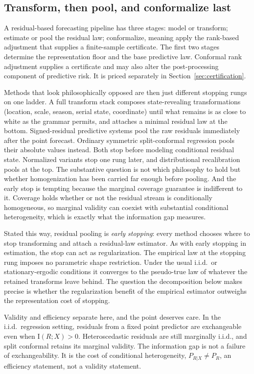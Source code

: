 \documentclass[11pt]{article}
\theoremstyle{remark}
\newcommand{\I}{\mathrm{I}}
\begin{document}
\subsection{Transform, then pool, and conformalize last}\label{sec:transformconform}

A residual-based forecasting pipeline has three stages: model or transform; estimate or pool
the residual law; conformalize, meaning apply the rank-based adjustment that supplies a
finite-sample certificate. The first two stages determine the representation floor and the base predictive law.
Conformal rank adjustment supplies a certificate and may also alter the post-processing
component of predictive risk. It is priced separately in Section~\ref{sec:certification}.

Methods that look philosophically
opposed are then just different stopping rungs on one ladder. A full transform stack composes state-revealing transformations (location, scale, season,
serial state, coordinate) until what remains is as close to white as the grammar permits, and
attaches a minimal residual law at the bottom. Signed-residual predictive systems pool the raw residuals immediately after the point
forecast. Ordinary symmetric split-conformal regression pools their absolute values instead.
Both stop before modeling conditional residual state. Normalized variants stop one rung
later, and distributional recalibration pools at the top. The substantive question
is not which philosophy to hold but whether homogenization has been carried far enough before
pooling. And the early stop is tempting because the marginal coverage guarantee is
indifferent to it. Coverage holds whether or not the residual stream is conditionally homogeneous, so
marginal validity can coexist with substantial conditional heterogeneity, which is exactly
what the information gap measures.

Stated this way, residual pooling is \emph{early stopping}: every method chooses where to
stop transforming and attach a residual-law estimator. As with early stopping in estimation, the stop can act as regularization. The empirical law
at the stopping rung imposes no parametric shape restriction. Under the usual i.i.d.\ or
stationary-ergodic conditions it converges to the pseudo-true law of whatever the retained
transforms leave behind. The question the decomposition below makes precise is
whether the regularization benefit of the empirical estimator outweighs the representation
cost of stopping.

Validity and efficiency separate here, and the point deserves care. In the i.i.d.\ regression setting, residuals from a fixed point predictor are exchangeable
even when $\I(R;X)>0$. Heteroscedastic residuals are still marginally i.i.d., and split
conformal retains its marginal validity. The information gap is
not a failure of exchangeability. It is the cost of conditional heterogeneity,
$P_{R|X}\neq P_R$, an efficiency statement, not a validity statement.
\end{document}
